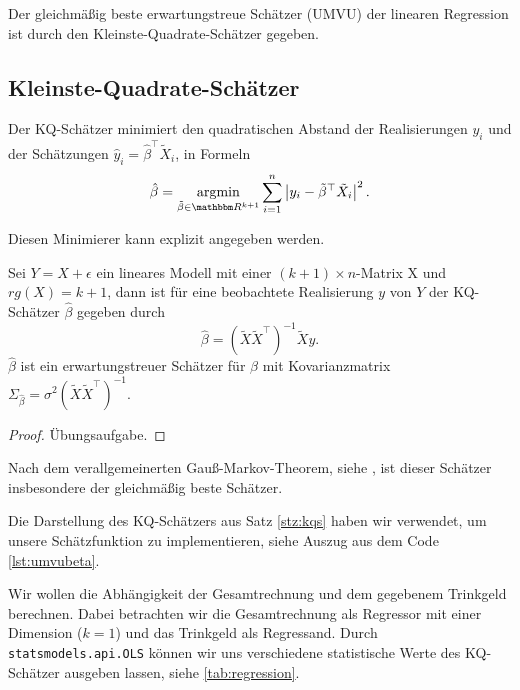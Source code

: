Der gleichmäßig beste erwartungstreue Schätzer (UMVU) der linearen Regression ist durch den Kleinste-Quadrate-Schätzer gegeben.

\subsection{Kleinste-Quadrate-Schätzer}

Der KQ-Schätzer minimiert den quadratischen Abstand der Realisierungen $y_i$ und der Schätzungen $\hat{y}_i=\hat{\beta}^\top\tilde{X}_i$, in Formeln
\begin{equation}
    \hat{\beta} = \argmin_{\tilde{\beta}\in\R^{k+1}}\sum_{i=1}^n\left|y_i-\tilde{\beta}^\top\tilde{X}_i\right|^2.
\end{equation}

Diesen Minimierer kann explizit angegeben werden.
\begin{satz}\label{stz:kqs}
    Sei $Y = X + \epsilon$ ein lineares Modell
    mit einer $(k + 1)\times n$-Matrix X und $rg(X) = k + 1$, dann ist für eine beobachtete Realisierung
    $y$ von $Y$ der KQ-Schätzer $\hat{\beta}$ gegeben durch
    \begin{equation}
        \hat{\beta}=(\tilde{X}\tilde{X}^\top)^{-1}\tilde{X}y.
    \end{equation}
    $\hat{\beta}$ ist ein erwartungstreuer Schätzer für $\beta$ mit Kovarianzmatrix $\Sigma_{\hat{\beta}} = \sigma^2(\tilde{X}\tilde{X}^\top)^{-1}$.
\end{satz}
\begin{proof}
    Übungsaufgabe.
\end{proof}

Nach dem verallgemeinerten Gauß-Markov-Theorem, siehe \cite[][Satz 5.5.14]{ruschendorf2014mathematische}, ist dieser Schätzer insbesondere der gleichmäßig beste Schätzer.

Die Darstellung des KQ-Schätzers aus Satz \ref{stz:kqs} haben wir verwendet, um unsere Schätzfunktion zu implementieren, siehe Auszug aus dem Code \ref{lst:umvubeta}.

\noindent\begin{minipage}{\linewidth}

\end{minipage}

Wir wollen die Abhängigkeit der Gesamtrechnung und dem gegebenem Trinkgeld berechnen. Dabei betrachten wir die Gesamtrechnung als Regressor mit einer Dimension ($k=1$) und das Trinkgeld als Regressand.
Durch \lstinline|statsmodels.api.OLS| können wir uns verschiedene statistische Werte des KQ-Schätzer ausgeben lassen, siehe \cref*{tab:regression}.

